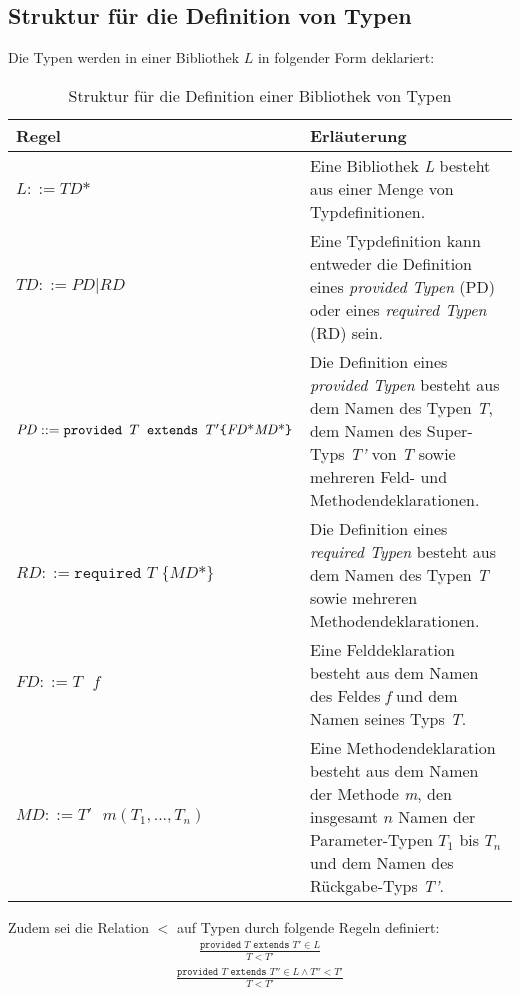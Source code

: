 \subsection{Struktur für die Definition von Typen}\label{sec:strukturTypen}
Die Typen werden in einer Bibliothek $L$ in folgender Form deklariert:
\begin{table}[H]
\centering
\begin{tabular}{|p{5.5cm}|p{8.5cm}|}
\hline
\hline
\centering\textbf{Regel} & \textbf{Erläuterung} \\
\hline
\hline
$\mathit{L} ::= \mathit{TD}\text{*}$ & Eine Bibliothek \emph{L} besteht aus einer Menge von Typdefinitionen.\\
\hline
$\mathit{TD} ::= \mathit{PD} | \mathit{RD}$ & Eine Typdefinition kann entweder die Definition eines \emph{provided Typen} (PD) oder eines \emph{required Typen} (RD) sein.\\
\hline
$\mathit{PD} ::= \newline\texttt{provided }T \texttt{ extends } T' \newline  \texttt{\{} \mathit{FD}\text{*} \mathit{MD}\text{*}\texttt{\}}$& Die Definition eines \emph{provided Typen} besteht aus dem Namen des Typen \emph{T}, dem Namen des Super-Typs \emph{T'} von \emph{T} sowie mehreren Feld- und Methodendeklarationen.\\
\hline
$\mathit{RD} ::= \texttt{required } T \texttt{ \{}\mathit{MD}\text{*}\texttt{\}}$ & Die Definition eines \emph{required Typen} besteht aus dem Namen des Typen \emph{T} sowie mehreren Methodendeklarationen.\\
\hline
$\mathit{FD} ::= T \texttt{ }\mathit{f}$ & Eine Felddeklaration besteht aus dem Namen des Feldes \emph{f} und dem Namen seines Typs \emph{T}.\\
\hline
$\mathit{MD} ::= \mathit{T'}\texttt{ }\mathit{m(T_1,...,T_n)}$ & Eine Methodendeklaration besteht aus dem Namen der Methode \emph{m}, den insgesamt $n$ Namen der Parameter-Typen $T_1$ bis $T_n$ und dem Namen des Rückgabe-Typs \emph{T'}.\\
\hline
\hline
\end{tabular}
\caption{Struktur für die Definition einer Bibliothek von Typen}
 \label{tab_typeStruct}
\end{table}
\noindent
Zudem sei die Relation $<$ auf Typen durch folgende Regeln definiert:
\begin{gather*}
\frac{\texttt{provided }T \texttt{ extends } T' \in L}{T < T'}
\end{gather*}
\begin{gather*}
\frac{\texttt{provided } T \texttt{ extends } T'' \in L \wedge T'' < T'}{T < T'}
\end{gather*}
